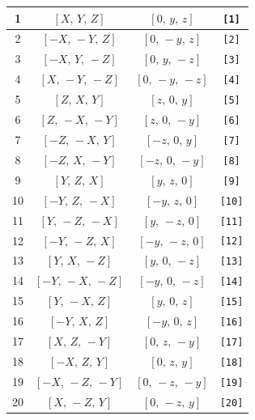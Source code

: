 \documentclass[fleqn,8pt]{jsarticle}
\begin{document}
\begin{longtable}{cccc}
1 & $\left[ X,\, Y,\, Z \right]$ & $\left[ 0,\, y,\, z \right]$ & {\tt [1]} \\ \hline
2 & $\left[ - X,\, - Y,\, Z \right]$ & $\left[ 0,\, - y,\, z \right]$ & {\tt [2]} \\ \hline
3 & $\left[ - X,\, Y,\, - Z \right]$ & $\left[ 0,\, y,\, - z \right]$ & {\tt [3]} \\ \hline
4 & $\left[ X,\, - Y,\, - Z \right]$ & $\left[ 0,\, - y,\, - z \right]$ & {\tt [4]} \\ \hline
5 & $\left[ Z,\, X,\, Y \right]$ & $\left[ z,\, 0,\, y \right]$ & {\tt [5]} \\ \hline
6 & $\left[ Z,\, - X,\, - Y \right]$ & $\left[ z,\, 0,\, - y \right]$ & {\tt [6]} \\ \hline
7 & $\left[ - Z,\, - X,\, Y \right]$ & $\left[ - z,\, 0,\, y \right]$ & {\tt [7]} \\ \hline
8 & $\left[ - Z,\, X,\, - Y \right]$ & $\left[ - z,\, 0,\, - y \right]$ & {\tt [8]} \\ \hline
9 & $\left[ Y,\, Z,\, X \right]$ & $\left[ y,\, z,\, 0 \right]$ & {\tt [9]} \\ \hline
10 & $\left[ - Y,\, Z,\, - X \right]$ & $\left[ - y,\, z,\, 0 \right]$ & {\tt [10]} \\ \hline
11 & $\left[ Y,\, - Z,\, - X \right]$ & $\left[ y,\, - z,\, 0 \right]$ & {\tt [11]} \\ \hline
12 & $\left[ - Y,\, - Z,\, X \right]$ & $\left[ - y,\, - z,\, 0 \right]$ & {\tt [12]} \\ \hline
13 & $\left[ Y,\, X,\, - Z \right]$ & $\left[ y,\, 0,\, - z \right]$ & {\tt [13]} \\ \hline
14 & $\left[ - Y,\, - X,\, - Z \right]$ & $\left[ - y,\, 0,\, - z \right]$ & {\tt [14]} \\ \hline
15 & $\left[ Y,\, - X,\, Z \right]$ & $\left[ y,\, 0,\, z \right]$ & {\tt [15]} \\ \hline
16 & $\left[ - Y,\, X,\, Z \right]$ & $\left[ - y,\, 0,\, z \right]$ & {\tt [16]} \\ \hline
17 & $\left[ X,\, Z,\, - Y \right]$ & $\left[ 0,\, z,\, - y \right]$ & {\tt [17]} \\ \hline
18 & $\left[ - X,\, Z,\, Y \right]$ & $\left[ 0,\, z,\, y \right]$ & {\tt [18]} \\ \hline
19 & $\left[ - X,\, - Z,\, - Y \right]$ & $\left[ 0,\, - z,\, - y \right]$ & {\tt [19]} \\ \hline
20 & $\left[ X,\, - Z,\, Y \right]$ & $\left[ 0,\, - z,\, y \right]$ & {\tt [20]} \\ \hline

\end{longtable}
\end{document}
